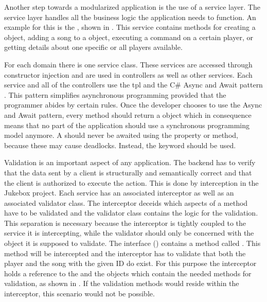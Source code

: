 

Another step towards a modularized application is the use of a service layer. The service layer handles all the business logic the application needs to function. An example for this is the , shown in . This service contains methods for creating a  object, adding a song to a  object, executing a command on a certain player, or getting details about one specific or all players available.

For each domain there is one service class. These services are accessed through constructor injection and are used in controllers as well as other services. Each service and all of the controllers use the \gls{tpl} and the C\# Async and Await pattern \cite{tpl}. This pattern simplifies asynchronous programming provided that the programmer abides by certain rules. Once the developer chooses to use the Async and Await pattern, every method should return a  object which in consequence means that no part of the application should use a synchronous programming model anymore. A  should never be awaited using the  property or  method, because these may cause deadlocks. Instead, the  keyword should be used.


Validation is an important aspect of any application. The backend has to verify that the data sent by a client is structurally and semantically correct and that the client is authorized to execute the action. This is done by interception in the Jukebox project. Each service has an associated interceptor as well as an associated validator class. The interceptor deceids which aspects of a method have to be validated and the validator class contains the logic for the validation. This separation is necessary because the interceptor is tightly coupled to the service it is intercepting, while the validator should only be concerned with the object it is supposed to validate. The  interface () contains a method called . This method will be intercepted and the interceptor has to validate that both the player and the song with the given ID do exist. For this purpose the interceptor holds a reference to the  and the  objects which contain the needed methods for validation, as shown in . If the validation methods would reside within the interceptor, this scenario would not be possible.

